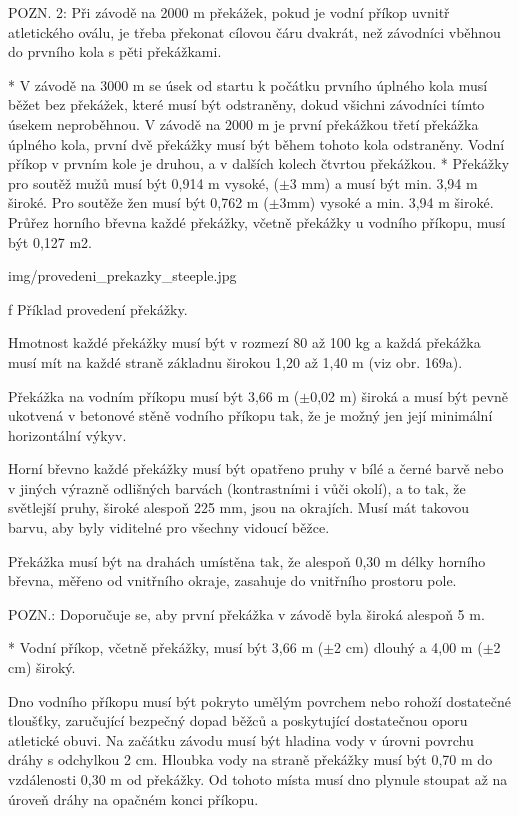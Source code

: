 POZN. 2: Při závodě na 2000 m překážek, pokud je vodní příkop uvnitř atletického oválu, je třeba překonat cílovou čáru dvakrát, než závodníci vběhnou do prvního kola s pěti překážkami.

* V závodě na 3000 m se úsek od startu k počátku prvního úplného kola musí běžet bez překážek, které musí být odstraněny, dokud všichni závodníci tímto úsekem neproběhnou. V závodě na 2000 m je první překážkou třetí překážka úplného kola, první dvě překážky musí být během tohoto kola odstraněny. Vodní příkop v prvním kole je druhou, a v dalších kolech čtvrtou překážkou.
* Překážky pro soutěž mužů musí být 0,914 m vysoké, ($\pm$3 mm) a musí být min. 3,94 m široké. Pro soutěže žen musí být 0,762 m ($\pm$3mm) vysoké a min. 3,94 m široké. Průřez horního břevna každé překážky, včetně překážky u vodního příkopu, musí být 0,127 m2.

\picw=9cm \inspic img/provedeni_prekazky_steeple.jpg
\caption/f Příklad provedení překážky.

Hmotnost každé překážky musí být v rozmezí 80 až 100 kg a každá překážka musí mít na každé straně základnu širokou 1,20 až 1,40 m (viz obr. 169a).

Překážka na vodním příkopu musí být 3,66 m ($\pm$0,02 m) široká a musí být pevně ukotvená v betonové stěně vodního příkopu tak, že je možný jen její minimální horizontální výkyv.

Horní břevno každé překážky musí být opatřeno pruhy v bílé a černé barvě nebo v jiných výrazně odlišných barvách (kontrastními i vůči okolí), a to tak, že světlejší pruhy, široké alespoň 225 mm, jsou na okrajích. Musí mát takovou barvu, aby byly viditelné pro všechny vidoucí běžce.

Překážka musí být na drahách umístěna tak, že alespoň 0,30 m délky horního břevna, měřeno od vnitřního okraje, zasahuje do vnitřního prostoru pole.

POZN.:  Doporučuje se, aby první překážka v závodě byla široká alespoň 5 m.

* Vodní příkop, včetně překážky, musí být 3,66 m ($\pm$2 cm) dlouhý a 4,00 m ($\pm$2 cm) široký.

Dno vodního příkopu musí být pokryto umělým povrchem nebo rohoží dostatečné tloušťky, zaručující bezpečný dopad běžců a poskytující dostatečnou oporu atletické obuvi. Na začátku závodu musí být hladina vody v úrovni povrchu dráhy s odchylkou 2 cm. Hloubka vody na straně překážky musí být 0,70 m do vzdálenosti 0,30 m od překážky. Od tohoto místa musí dno plynule stoupat až na úroveň dráhy na opačném konci příkopu.

